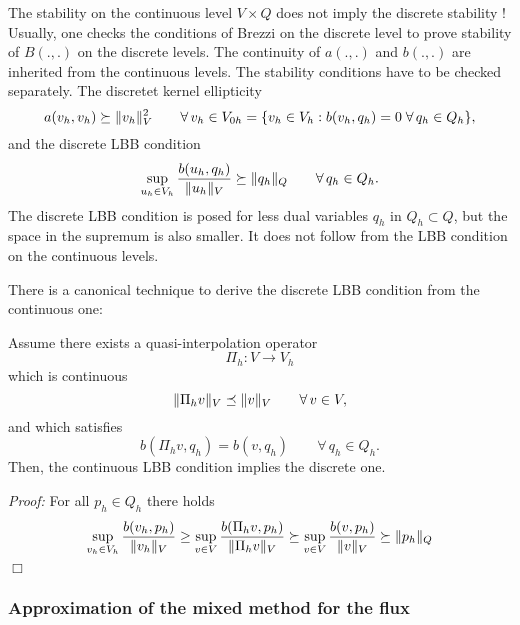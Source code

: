 The stability on the continuous level $V \times Q$ does not imply the
discrete stability ! Usually, one checks the conditions of Brezzi 
on the discrete level to prove stability of $B(.,.)$ on the discrete
levels. The continuity of $a(.,.)$ and $b(.,.)$ are inherited from the
continuous levels. The stability conditions have to be checked separately.
The discretet kernel ellipticity
\begin{equation}
a(v_h,v_h) \succeq \| v_h \|_V^2 \qquad \forall \, v_h \in V_{0h} = \{ v_h \in V_h : b(v_h,q_h) = 0 \; \forall \, q_h \in Q_h \},
\end{equation}
and the discrete LBB condition
\begin{equation}
\sup_{u_h \in V_h} \frac{b(u_h, q_h)}{ \| u_h \|_V } \succeq \| q_h \|_Q \qquad \forall \, q_h \in Q_h.
\end{equation}
The discrete LBB condition is posed for less dual variables $q_h$ in $Q_h \subset Q$, 
but the space in the supremum is also smaller. It does not follow 
from the LBB condition on the continuous levels.

There is a canonical technique to derive the discrete LBB condition from
the continuous one:
\begin{lemma} \label{lemma_cont2discr_lbb} Assume there exists a quasi-interpolation operator
$$
\Pi_h : V \rightarrow V_h 
$$
which is continuous
$$
\| \Pi_h v \|_V \preceq \| v \|_V \qquad \forall \, v \in V,
$$
and which satisfies 
$$
b(\Pi_h v, q_h) = b(v,q_h) \qquad \forall \, q_h \in Q_h.
$$
Then, the continuous LBB condition implies the discrete one.
\end{lemma}
{\em Proof:} For all $p_h \in Q_h$ there holds
$$
\sup_{v_h \in V_h} \frac { b(v_h, p_h) }{\| v_h \|_V}
\geq 
\sup_{v \in V} \frac{b(\Pi_h v,p_h)}{\| \Pi_h v\|_V}
\succeq 
\sup_{v \in V} \frac{b(v, p_h)}{  \| v \|_V }
\succeq
\| p_h \|_Q
$$
\hfill $\Box$


\subsubsection{Approximation of the mixed method for the flux}

